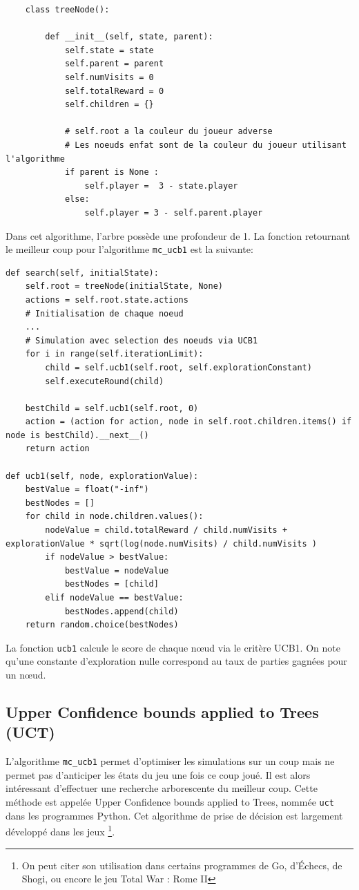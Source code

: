 \documentclass[a4paper]{article}
\theoremstyle{definition}
\begin{document}
\begin{lstlisting}
	class treeNode():
	
		def __init__(self, state, parent):
			self.state = state
			self.parent = parent
			self.numVisits = 0
			self.totalReward = 0
			self.children = {}
			
			# self.root a la couleur du joueur adverse 
			# Les noeuds enfat sont de la couleur du joueur utilisant l'algorithme
			if parent is None : 
				self.player =  3 - state.player
			else:
				self.player = 3 - self.parent.player
\end{lstlisting}

Dans cet algorithme, l'arbre possède une profondeur de 1. La fonction retournant le meilleur coup pour l'algorithme \texttt{mc\_ucb1} est la suivante:

\begin{lstlisting}
def search(self, initialState):
	self.root = treeNode(initialState, None)
	actions = self.root.state.actions
	# Initialisation de chaque noeud
	...
	# Simulation avec selection des noeuds via UCB1
	for i in range(self.iterationLimit):
		child = self.ucb1(self.root, self.explorationConstant)
		self.executeRound(child)
		
	bestChild = self.ucb1(self.root, 0)
	action = (action for action, node in self.root.children.items() if node is bestChild).__next__()
	return action
	
def ucb1(self, node, explorationValue):
	bestValue = float("-inf")
	bestNodes = []
	for child in node.children.values():
		nodeValue = child.totalReward / child.numVisits + explorationValue * sqrt(log(node.numVisits) / child.numVisits )
		if nodeValue > bestValue:
			bestValue = nodeValue
			bestNodes = [child]
		elif nodeValue == bestValue:
			bestNodes.append(child)
	return random.choice(bestNodes)
\end{lstlisting}

La fonction \texttt{ucb1} calcule le score de chaque nœud via le critère UCB1. On note qu'une constante d'exploration nulle correspond au taux de parties gagnées pour un nœud.

\subsection{Upper Confidence bounds applied to Trees (UCT)}

L'algorithme \texttt{mc\_ucb1} permet d'optimiser les simulations sur un coup mais ne permet pas d'anticiper les états du jeu une fois ce coup joué. Il est alors intéressant d'effectuer une recherche arborescente du meilleur coup. Cette méthode est appelée Upper Confidence bounds applied to Trees, nommée \texttt{uct} dans les programmes Python. Cet algorithme de prise de décision est largement développé dans les jeux \footnote{On peut citer son utilisation dans certains programmes de Go, d'Échecs, de Shogi, ou encore le jeu Total War : Rome II}.
\end{document}
